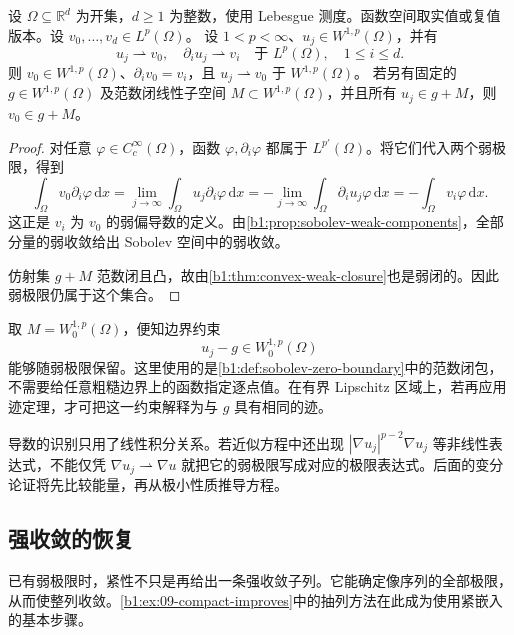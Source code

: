 \begin{proposition}\label{b1:prop:sobolev-weak-limit-identification}
设 \(\Omega\subseteq\mathbb R^d\) 为开集，\(d\geq1\) 为整数，使用 Lebesgue 测度。函数空间取实值或复值版本。设 \(v_0,\ldots,v_d\in L^p(\Omega)\)。
设 \(1<p<\infty\)、\(u_j\in W^{1,p}(\Omega)\)，并有
\[
 u_j\rightharpoonup v_0,\quad
 \partial_i u_j\rightharpoonup v_i
 \quad\text{于 }L^p(\Omega),\quad 1\le i\le d.
\]
则 \(v_0\in W^{1,p}(\Omega)\)、\(\partial_i v_0=v_i\)，且
\(u_j\rightharpoonup v_0\) 于 \(W^{1,p}(\Omega)\)。
若另有固定的 \(g\in W^{1,p}(\Omega)\) 及范数闭线性子空间
\(M\subset W^{1,p}(\Omega)\)，并且所有 \(u_j\in g+M\)，则 \(v_0\in g+M\)。
\end{proposition}
\begin{proof}
对任意 \(\varphi\in C_c^\infty(\Omega)\)，函数 \(\varphi,\partial_i\varphi\) 都属于 \(L^{p'}(\Omega)\)。将它们代入两个弱极限，得到
\[
 \int_\Omega v_0\partial_i\varphi\,\mathrm dx
 =\lim_{j\to\infty}\int_\Omega u_j\partial_i\varphi\,\mathrm dx
 =-\lim_{j\to\infty}\int_\Omega\partial_i u_j\varphi\,\mathrm dx
 =-\int_\Omega v_i\varphi\,\mathrm dx.
\]
这正是 \(v_i\) 为 \(v_0\) 的弱偏导数的定义。由\cref{b1:prop:sobolev-weak-components}，全部分量的弱收敛给出 Sobolev 空间中的弱收敛。

仿射集 \(g+M\) 范数闭且凸，故由\cref{b1:thm:convex-weak-closure}也是弱闭的。因此弱极限仍属于这个集合。
\end{proof}

取 \(M=W_0^{1,p}(\Omega)\)，便知边界约束
\[
 u_j-g\in W_0^{1,p}(\Omega)
\]
能够随弱极限保留。这里使用的是\cref{b1:def:sobolev-zero-boundary}中的范数闭包，不需要给任意粗糙边界上的函数指定逐点值。在有界 Lipschitz 区域上，若再应用迹定理，才可把这一约束解释为与 \(g\) 具有相同的迹。

\ProseParagraphBreak

导数的识别只用了线性积分关系。若近似方程中还出现
\(|\nabla u_j|^{p-2}\nabla u_j\) 等非线性表达式，不能仅凭
\(\nabla u_j\rightharpoonup\nabla u\) 就把它的弱极限写成对应的极限表达式。后面的变分论证将先比较能量，再从极小性质推导方程。

\subsection{强收敛的恢复}
\label{b1:subsec:250303}

已有弱极限时，紧性不只是再给出一条强收敛子列。它能确定像序列的全部极限，从而使整列收敛。\cref{b1:ex:09-compact-improves}中的抽列方法在此成为使用紧嵌入的基本步骤。

